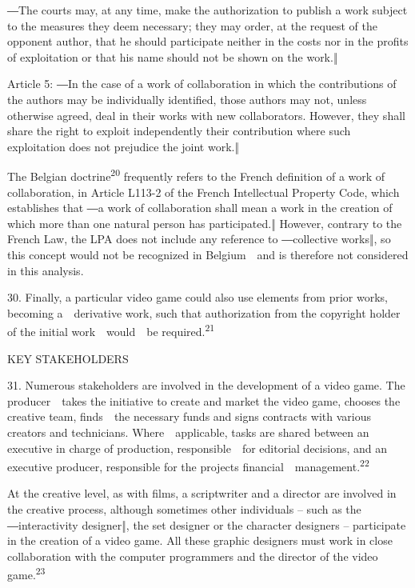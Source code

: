 \documentclass[
]{article}
\begin{document}
{―The courts may, at any }{time, make the authorization to publish a
work subject to the measures they deem necessary; they may order, at the
request of the opponent author, that he should participate neither in
the costs nor in the profits of exploitation or that his name should
no}{t be shown on the work.‖}

{Article 5: }{―In the case of a work of collaboration in which the
contributions of }{the authors may be individually identified, those
authors may not, unless otherwise agreed, deal in their works with new
collaborators. However, they shall share the right to exploit
independently their contribution where such }{exploitation does not
prejudice the joint work.‖}

{The Belgian doctrine}\textsuperscript{{20 }}{frequently refers to the
French definition of a }{work of collaboration}{, in Article L113-2 of
the }{French Intellectual Property Code}{, which establishes that ―}{a
work of collaboration shall mean a work in the creation of which more
than one natural person }{has participated.‖ }{However, contrary to the
French Law, the LPA does not include any }{reference to ―}{collect}{ive
works‖}{, so this concept would not be recognized in Belgium~~and is
therefore not considered in this analysis.}

{30. }{Finally, a particular video game could also use elements from
prior works, becoming a~~derivative work, such that authorization from
the copyright holder of the initial work~~would~~be
required.}\textsuperscript{{21}}

{KEY STAKEHOLDERS}

{31. }{Numerous stakeholders are involved in the development of a video
game. The producer~~takes the initiative to create and market the video
game, chooses the creative team, finds~~the necessary funds and signs
contracts with various creators and technicians. Where~~applicable,
tasks are shared between an }{executive in charge of production}{,
responsible~~for editorial decisions, and an }{executive producer}{,
responsible for the project\textquotesingle s
financial~~management.}\textsuperscript{{22}}

{At the creative level, as with films, a scriptwriter and a director are
involved in the creative process, although sometimes other individuals
}{-- such as the ―}{interactivity designer}{‖, the }{set designer or the
character designers }{-- }{participate in the creation of a video game.
All these graphic designers must work in close collaboration with the
computer programmers and the director of the video
game.}\textsuperscript{{23}}
\end{document}
